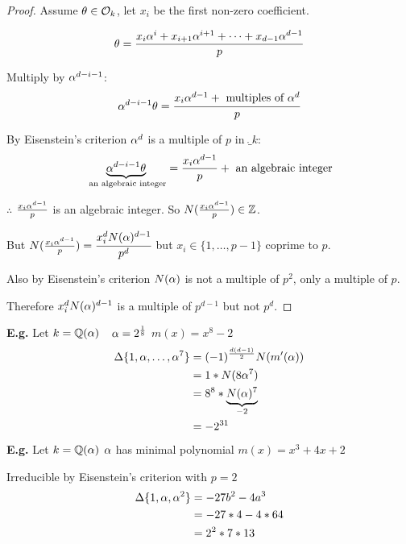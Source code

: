 \documentclass[11pt]{article}
\begin{document}
\begin{proof}
Assume $\theta \in \mathcal{O}_k$, let $x_i$ be the first non-zero coefficient.

	\begin{align*}
		\theta = \frac{x_i\alpha^i + x_{i+1} \alpha^{i+1} + \dots + x_{d-1} \alpha^{d-1}}{p}
	\end{align*}
	
	Multiply by $\alpha^{d-i-1}$:
	\begin{align*}
		\alpha^{d-i-1}\theta = \cfrac{x_i \alpha^{d-1} + \text{ multiples of } \alpha^d }{p}
	\end{align*}
	
	By Eisenstein's criterion $\alpha^d$ is a multiple of $p$ in $\ring_k$:
	\begin{align*}
	\underbrace{\alpha^{d-i-1} \theta}_\text{ an algebraic integer} = \frac{x_i\alpha^{d-1}}{p} + \text{ an algebraic integer}
	\end{align*}

	$\therefore$ $\frac{x_i \alpha^{d-1}}{p} $ is an algebraic integer. So $N(\frac{x_i\alpha^{d-1}}p) \in \mathbb{Z}$.
\spa

	But $N(\frac{x_i\alpha^{d-1}}p) = \cfrac{x_i^d N(\alpha)^{d-1}}{p^d}$ but $x_i \in \{1, \dots, p-1\}$ coprime to $p$.

	Also by Eisenstein's criterion $N(\alpha)$ is not a multiple of $p^2$, only a multiple of $p$. 

	Therefore $x_i^d N(\alpha)^{d-1} $ is a multiple of $p^{d-1}$ but not $p^d$. \lightning
\end{proof}
\spa
\textbf{E.g.} Let $k = \mathbb{Q}(\alpha)$  $\hspace{7pt} \alpha = 2^{\frac{1}{8}}$ \hspace{7pt} $m(x) = x^8 -2$
\begin{align*}
	\Delta\{1,\alpha,\dots, \alpha^7\} &= (-1)^\frac{d(d-1)}{2} N(m'(\alpha))\\
	&= 1* N(8\alpha^7 ) \\
	&=8^8 *\underbrace{N(\alpha)^7}_{-2} \\
	&= -2^{31}
\end{align*}
\textbf{E.g.} Let $k = \mathbb{Q}(\alpha)$\hspace{7pt} $\alpha$ has minimal polynomial $m(x) = x^3 + 4x+2$
\spa

Irreducible by Eisenstein's criterion with $p=2$
\begin{align*}
	\Delta\{ 1, \alpha, \alpha^2 \} &= -27b^2 - 4a^3\\
	&=-27*4 - 4*64\\
	& = 2^2 * 7* 13
\end{align*}
\end{document}
